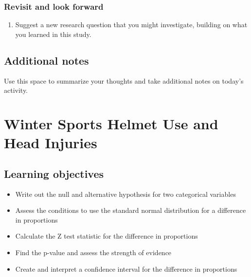 \documentclass[
]{report}
\providecommand{\tightlist}{%
  \setlength{\itemsep}{0pt}\setlength{\parskip}{0pt}}
\begin{document}
\hypertarget{revisit-and-look-forward}{%
\subsection*{Revisit and look forward}\label{revisit-and-look-forward}}

\begin{enumerate}
\def\labelenumi{\arabic{enumi}.}
\setcounter{enumi}{29}
\tightlist
\item
  Suggest a new research question that you might investigate, building on what you learned in this study.
\end{enumerate}

\vspace{.6in}

\newpage

\hypertarget{additional-notes}{%
\section{Additional notes}\label{additional-notes}}

Use this space to summarize your thoughts and take additional notes on today's activity.

\hypertarget{winter-sports-helmet-use-and-head-injuries}{%
\chapter{Winter Sports Helmet Use and Head Injuries}\label{winter-sports-helmet-use-and-head-injuries}}

\hypertarget{learning-objectives}{%
\section{Learning objectives}\label{learning-objectives}}

\begin{itemize}
\item
  Write out the null and alternative hypothesis for two categorical variables
\item
  Assess the conditions to use the standard normal distribution for a difference in proportions
\item
  Calculate the Z test statistic for the difference in proportions
\item
  Find the p-value and assess the strength of evidence
\item
  Create and interpret a confidence interval for the difference in proportions
\end{itemize}
\end{document}
